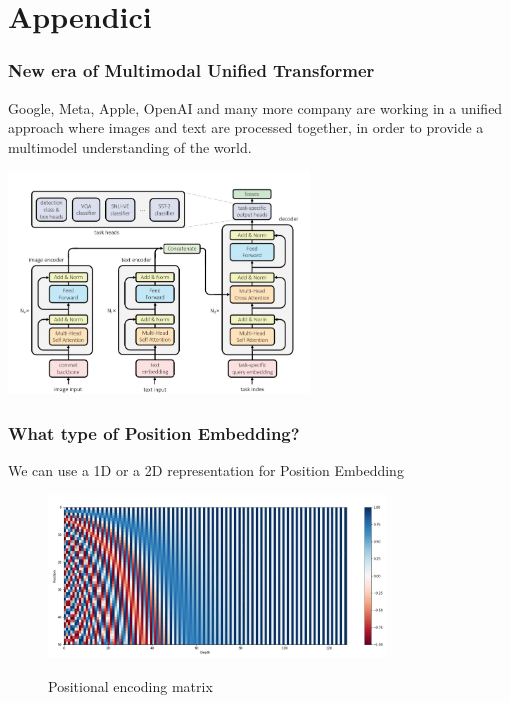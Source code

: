 \section{Appendici}

\begin{frame}
\frametitle{New era of Multimodal Unified Transformer}  
Google, Meta, Apple, OpenAI and many more company are working in a unified approach where images and text are processed together,
in order to provide a multimodel understanding of the world.
\begin{center}
    \includegraphics[width=0.6\textwidth]{img/4-section/Multimodel.png}
\end{center}

\end{frame}

\begin{frame}
    \frametitle{What type of Position Embedding?}
    
We can use a 1D or a 2D representation for Position Embedding

\begin{figure}
    \includegraphics[width=0.8\textwidth]{img/2-section/positional_encoding.png} 
    \label{fig:Positional_encoding}
    \caption{Positional encoding matrix}
\end{figure}
\end{frame}



